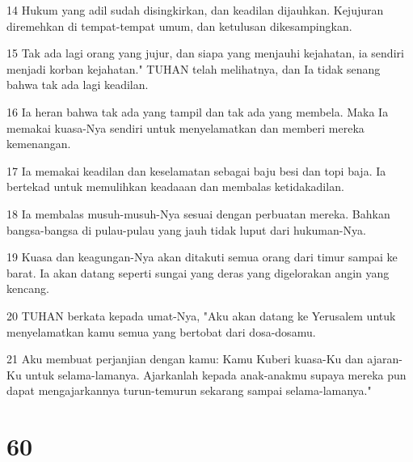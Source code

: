 \par 14 Hukum yang adil sudah disingkirkan, dan keadilan dijauhkan. Kejujuran diremehkan di tempat-tempat umum, dan ketulusan dikesampingkan.
\par 15 Tak ada lagi orang yang jujur, dan siapa yang menjauhi kejahatan, ia sendiri menjadi korban kejahatan." TUHAN telah melihatnya, dan Ia tidak senang bahwa tak ada lagi keadilan.
\par 16 Ia heran bahwa tak ada yang tampil dan tak ada yang membela. Maka Ia memakai kuasa-Nya sendiri untuk menyelamatkan dan memberi mereka kemenangan.
\par 17 Ia memakai keadilan dan keselamatan sebagai baju besi dan topi baja. Ia bertekad untuk memulihkan keadaaan dan membalas ketidakadilan.
\par 18 Ia membalas musuh-musuh-Nya sesuai dengan perbuatan mereka. Bahkan bangsa-bangsa di pulau-pulau yang jauh tidak luput dari hukuman-Nya.
\par 19 Kuasa dan keagungan-Nya akan ditakuti semua orang dari timur sampai ke barat. Ia akan datang seperti sungai yang deras yang digelorakan angin yang kencang.
\par 20 TUHAN berkata kepada umat-Nya, "Aku akan datang ke Yerusalem untuk menyelamatkan kamu semua yang bertobat dari dosa-dosamu.
\par 21 Aku membuat perjanjian dengan kamu: Kamu Kuberi kuasa-Ku dan ajaran-Ku untuk selama-lamanya. Ajarkanlah kepada anak-anakmu supaya mereka pun dapat mengajarkannya turun-temurun sekarang sampai selama-lamanya."

\chapter{60}

